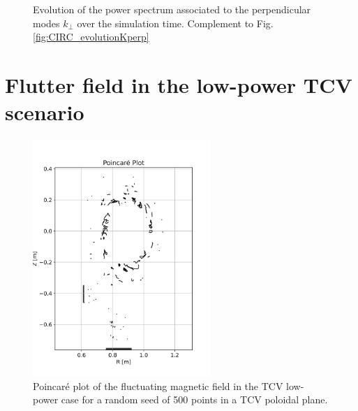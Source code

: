 \begin{figure}[H]
\begin{subfigure}[t]{0.45\textwidth}
		\label{fig:CIRC_evolutionKperp_PHIAJ}
	\end{subfigure}
	\caption{Evolution of the power spectrum associated to the perpendicular modes $k_\perp$ over the simulation time. Complement to Fig. \ref{fig:CIRC_evolutionKperp}}
	\label{fig:CIRC_evolutionKperp_bis}
\end{figure}



\section{Flutter field in the low-power TCV scenario}
\label{sec:turbulentProfiles_poincareLmode}


\begin{figure}[H]\centering
	\centering
	\includegraphics[width=0.6\textwidth]{schemes/poincareTCV_Lmode.jpg}
	\caption{Poincaré plot of the fluctuating magnetic field in the TCV low-power case for a random seed of 500 points in a TCV poloidal plane.}
	\label{fig:TCV_poincareFlutter_Lmode}
\end{figure}


